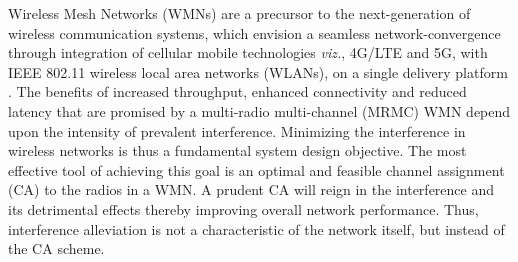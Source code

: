 \documentclass[conference]{IEEEtran}
\begin{document}
Wireless Mesh Networks (WMNs) are a precursor to the next-generation of wireless communication systems, which envision a seamless network-convergence through integration of cellular mobile technologies \emph{viz.}, 4G/LTE and 5G, with IEEE 802.11 wireless local area networks (WLANs), on a single delivery platform \cite{12Capone}. 
The benefits of increased throughput, enhanced connectivity and reduced latency that are promised by a multi-radio multi-channel (MRMC) WMN depend upon the intensity of prevalent interference. Minimizing the interference in wireless networks is thus a fundamental system design objective. The most effective tool of achieving this goal is an optimal and feasible channel assignment (CA) to the radios in a WMN. A prudent CA will reign in the interference and its detrimental effects thereby improving overall network performance. Thus, interference alleviation is not a characteristic of the network itself, but instead of the CA scheme.
\end{document}
